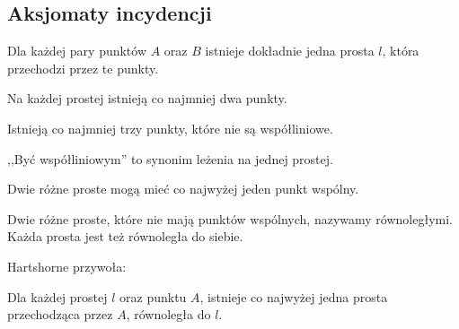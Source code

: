 %

\subsection{Aksjomaty incydencji}
\begin{axiom}[incydencji, I1]
    Dla każdej pary punktów $A$ oraz $B$ istnieje dokładnie jedna prosta $l$, która przechodzi przez te punkty.
\end{axiom}

\begin{axiom}[incydencji, I2]
    Na każdej prostej istnieją co najmniej dwa punkty.
\end{axiom}

\begin{axiom}[incydencji, I3]
    Istnieją co najmniej trzy punkty, które nie są współliniowe.
\end{axiom}

,,Być współliniowym'' to synonim leżenia na jednej prostej.
%

\begin{proposition}
    Dwie różne proste mogą mieć co najwyżej jeden punkt wspólny.
\end{proposition}

\begin{definition}
    Dwie różne proste, które nie mają punktów wspólnych, nazywamy równoległymi.
    Każda prosta jest też równoległa do siebie.
\end{definition}
%

Hartshorne \cite[s. 38]{hartshorne2000} przywoła:

\begin{axiom}[Playfaira, P]
    Dla każdej prostej $l$ oraz punktu $A$, istnieje co najwyżej jedna prosta przechodząca przez $A$, równoległa do $l$.
\end{axiom}
%

